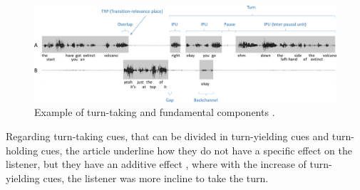 \documentclass[../main.tex]{subfiles}
\begin{document}
\begin{figure}[ht]
    \centering
    \includegraphics[width=\textwidth]{images/TPUs.png}
    \caption{Example of turn-taking and fundamental components \cite{anderson1991hcrc}.}
    \label{fig:TPUs}
\end{figure}


Regarding turn-taking cues, that can be divided in turn-yielding cues and turn-holding cues, the article underline how they do not have a specific effect on the listener, but they have an additive effect , where with the increase of turn-yielding cues, the listener was more incline to take the turn. 
\end{document}
